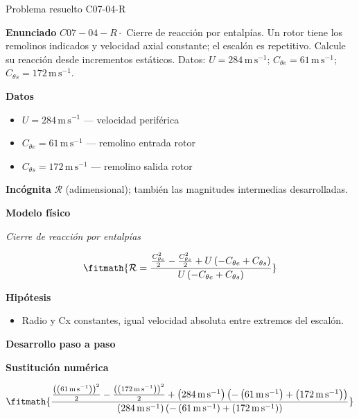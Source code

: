 \documentclass[10pt,openany]{book}
\begin{document}
\begin{studiumworked}{Problema resuelto C07-04-R}


\noindent\textbf{Enunciado}
\(C07-04-R \cdot\) Cierre de reacción por entalpías. Un rotor tiene los remolinos indicados y velocidad axial constante; el escalón es repetitivo. Calcule su reacción desde incrementos estáticos. Datos: \(U=284\, \mathrm{m}\,\mathrm{s}^{-1}\); \(C_{\theta e}=61\, \mathrm{m}\,\mathrm{s}^{-1}\); \(C_{\theta s}=172\, \mathrm{m}\,\mathrm{s}^{-1}\).

\noindent\textbf{Datos}
\begin{itemize}
\item $U = 284\,\mathrm{m}\,\mathrm{s}^{-1}$ — velocidad periférica
\item $C_{\theta e} = 61\,\mathrm{m}\,\mathrm{s}^{-1}$ — remolino entrada rotor
\item $C_{\theta s} = 172\,\mathrm{m}\,\mathrm{s}^{-1}$ — remolino salida rotor
\end{itemize}

\noindent\textbf{Incógnita}
$\mathcal{R}$ (adimensional); también las magnitudes intermedias desarrolladas.

\noindent\textbf{Modelo físico}

\noindent\textit{Cierre de reacción por entalpías}

\[
\fitmath{\mathcal R=\frac{\frac{C_{\theta e}^{2}}{2} - \frac{C_{\theta s}^{2}}{2} + U \left(- C_{\theta e} + C_{\theta s}\right)}{U \left(- C_{\theta e} + C_{\theta s}\right)}}
\]

\noindent\textbf{Hipótesis}
\begin{itemize}
\item Radio y Cx constantes, igual velocidad absoluta entre extremos del escalón.
\end{itemize}

\noindent\textbf{Desarrollo paso a paso}



\noindent\textbf{Sustitución numérica}

\[
\fitmath{\frac{\frac{\left(\left(61\,\mathrm{m}\,\mathrm{s}^{-1}\right)\right)^{2}}{2} - \frac{\left(\left(172\,\mathrm{m}\,\mathrm{s}^{-1}\right)\right)^{2}}{2} + \left(284\,\mathrm{m}\,\mathrm{s}^{-1}\right) \left(- \left(61\,\mathrm{m}\,\mathrm{s}^{-1}\right) + \left(172\,\mathrm{m}\,\mathrm{s}^{-1}\right)\right)}{\left(284\,\mathrm{m}\,\mathrm{s}^{-1}\right) \left(- \left(61\,\mathrm{m}\,\mathrm{s}^{-1}\right) + \left(172\,\mathrm{m}\,\mathrm{s}^{-1}\right)\right)}}
\]


\end{studiumworked}
\end{document}
